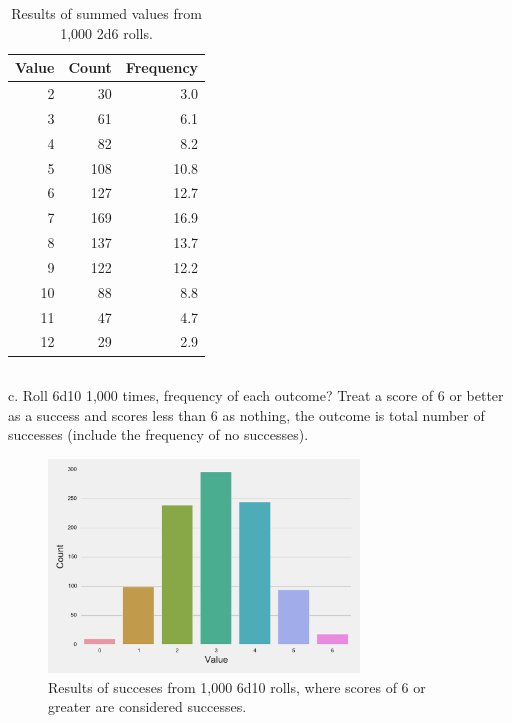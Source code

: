 \documentclass[twocolumn,letterpaper]{article}  %
\begin{document}
\begin{table}[h!]
\begin{center}
\begin{tabular}{*{3}{r}}
\toprule
Value & Count & Frequency \\
\midrule
 2   &  30      &  3.0 \\
 3   &  61      &  6.1 \\
 4   &  82      &  8.2 \\
 5   & 108      & 10.8 \\
 6   & 127      & 12.7 \\
 7   & 169      & 16.9 \\
 8   & 137      & 13.7 \\
 9   & 122      & 12.2 \\
10   &  88      &  8.8 \\
11   &  47      &  4.7 \\
12   &  29      &  2.9 \\
\bottomrule
\end{tabular}
\end{center}
\caption{Results of summed values from 1,000 2d6 rolls.}
\end{table}

\subsection{}
c. Roll 6d10 1,000 times, frequency of each outcome? Treat a score of 6 or better as a success and scores less than 6 as nothing, the outcome is total number of successes (include the frequency of no successes).
\begin{figure}[h!]
\centering
\includegraphics[width=3.25in]{6d10>6.pdf}
\caption{Results of succeses from 1,000 6d10 rolls, where scores of 6 or greater are considered successes.}
\end{figure}
\end{document}
